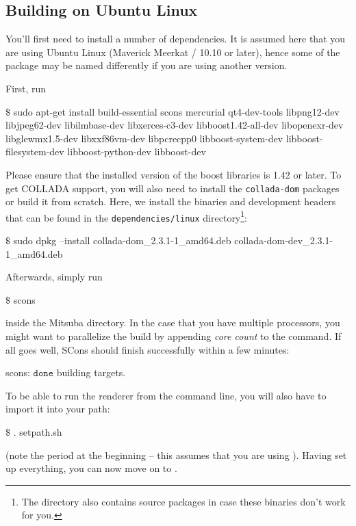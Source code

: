 \subsection{Building on Ubuntu Linux}
\label{sec:compiling-ubuntu}
You'll first need to install a number of dependencies. It is assumed here
that you are using Ubuntu Linux (Maverick Meerkat / 10.10 or later), hence some of the package may be named differently if you are 
using another version.

First, run
\begin{shell}
$\text{\$}$ sudo apt-get install build-essential scons mercurial qt4-dev-tools libpng12-dev 
    libjpeg62-dev libilmbase-dev libxerces-c3-dev libboost1.42-all-dev 
	libopenexr-dev libglewmx1.5-dev libxxf86vm-dev libpcrecpp0
	libboost-system-dev libboost-filesystem-dev libboost-python-dev libboost-dev
\end{shell}
Please ensure that the installed version of the boost libraries is 1.42 or later.
To get COLLADA support, you will also need to install the \texttt{collada-dom} packages or build it from scratch. Here, we install the  binaries and development headers that can be found in the \texttt{dependencies/linux} directory\footnote{The directory also contains source packages in case these binaries don't work for you.}:
\begin{shell}
$\text{\$}$ sudo dpkg --install collada-dom_2.3.1-1_amd64.deb collada-dom-dev_2.3.1-1_amd64.deb
\end{shell}
Afterwards, simply run
\begin{shell}
$\text{\$}$ scons
\end{shell}
inside the Mitsuba directory. In the case that you have multiple processors, you might want to parallelize the build by appending \emph{core count} to the command.
If all goes well, SCons should finish successfully within a few minutes:
\begin{shell}
scons: $\texttt{done}$ building targets.
\end{shell}
To be able to run the renderer from the command line, you will also have to import it into your path:
\begin{shell}
$\text{\$}$ . setpath.sh
\end{shell}
(note the period at the beginning -- this assumes that you are using ).
Having set up everything, you can now move on to .

